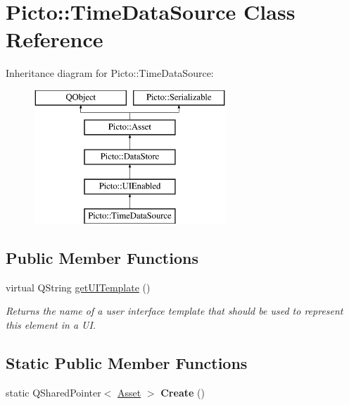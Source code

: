 \hypertarget{class_picto_1_1_time_data_source}{\section{Picto\-:\-:Time\-Data\-Source Class Reference}
\label{class_picto_1_1_time_data_source}
}
Inheritance diagram for Picto\-:\-:Time\-Data\-Source\-:\begin{figure}[H]
\begin{center}
\leavevmode
\includegraphics[height=5.000000cm]{class_picto_1_1_time_data_source}
\end{center}
\end{figure}
\subsection*{Public Member Functions}
\begin{DoxyCompactItemize}
\item 
\hypertarget{class_picto_1_1_time_data_source_accd6e0ceeb5cee65e21c27ccc27f499d}{virtual Q\-String \hyperlink{class_picto_1_1_time_data_source_accd6e0ceeb5cee65e21c27ccc27f499d}{get\-U\-I\-Template} ()}\label{class_picto_1_1_time_data_source_accd6e0ceeb5cee65e21c27ccc27f499d}

\begin{DoxyCompactList}\small\item\em Returns the name of a user interface template that should be used to represent this element in a U\-I. \end{DoxyCompactList}\end{DoxyCompactItemize}
\subsection*{Static Public Member Functions}
\begin{DoxyCompactItemize}
\item 
\hypertarget{class_picto_1_1_time_data_source_a8a195fc60ef4369722aaceb78e534eb0}{static Q\-Shared\-Pointer$<$ \hyperlink{class_picto_1_1_asset}{Asset} $>$ {\bfseries Create} ()}\label{class_picto_1_1_time_data_source_a8a195fc60ef4369722aaceb78e534eb0}

\end{DoxyCompactItemize}

